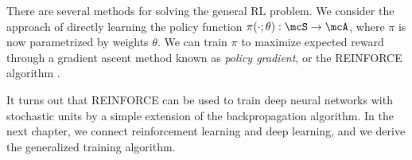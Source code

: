 \documentclass[12pt]{report}
\begin{document}
There are several methods for solving the general RL problem.
We consider the approach of directly learning the policy function $\pi( \cdot ; \theta) : \mcS \to \mcA$, where $\pi$ is now parametrized by weights $\theta$. We can train $\pi$  to maximize expected reward through a gradient ascent method known as \emph{policy gradient}, or the REINFORCE algorithm \citep{williams1992reinforce}.

It turns out that REINFORCE can be used to train deep neural networks with stochastic units by a simple extension of the backpropagation algorithm. In the next chapter, we connect reinforcement learning and deep learning, and we derive the generalized training algorithm.

%
%



\end{document}
